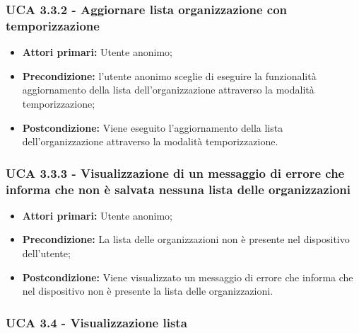 \subsubsection{UCA 3.3.2 - Aggiornare lista organizzazione con temporizzazione}%
\begin{itemize} 
	\item \textbf{Attori primari:} Utente anonimo;
	\item \textbf{Precondizione:} l'utente anonimo sceglie di eseguire la funzionalità aggiornamento della lista dell'organizzazione attraverso la modalità temporizzazione; 	
	\item \textbf{Postcondizione:} Viene eseguito l'aggiornamento della lista dell'organizzazione attraverso la modalità temporizzazione.
\end{itemize}

\subsubsection{UCA 3.3.3 - Visualizzazione di un messaggio di errore che informa che non è salvata nessuna lista delle organizzazioni}%
\begin{itemize}
	\item \textbf{Attori primari:} Utente anonimo;
	\item \textbf{Precondizione:} La lista delle organizzazioni non è presente nel dispositivo dell'utente;
	\item \textbf{Postcondizione:} Viene visualizzato un messaggio di errore che informa che nel dispositivo non è presente la lista delle organizzazioni.
\end{itemize}

\newpage


\subsubsection{UCA 3.4 - Visualizzazione lista}%

